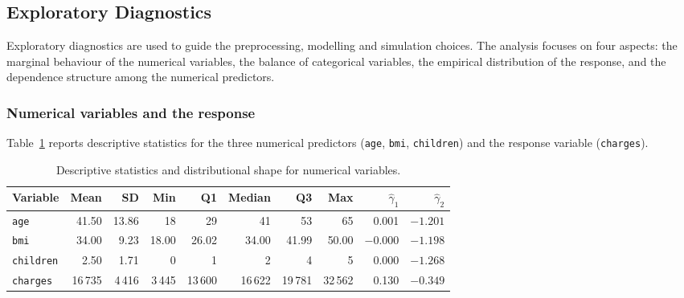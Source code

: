 
\subsection{Exploratory Diagnostics}
\label{sec:eda_model_simulation_design}

Exploratory diagnostics are used to guide the preprocessing, modelling and
simulation choices.  The analysis focuses on four aspects: the marginal
behaviour of the numerical variables, the balance of categorical variables,
the empirical distribution of the response, and the dependence structure
among the numerical predictors.


\subsubsection{Numerical variables and the response}

Table~\ref{tab:numeric_eda_summary} reports descriptive statistics for the
three numerical predictors (\texttt{age}, \texttt{bmi}, \texttt{children})
and the response variable (\texttt{charges}).

\begin{table}[H]
\centering
\small
\renewcommand{\arraystretch}{1.12}
\begin{tabular}{lrrrrrrrrr}
\toprule
\textbf{Variable} &
\textbf{Mean} &
\textbf{SD} &
\textbf{Min} &
\textbf{Q1} &
\textbf{Median} &
\textbf{Q3} &
\textbf{Max} &
$\widehat{\gamma}_1$ &
$\widehat{\gamma}_2$ \\
\midrule
\texttt{age}      & 41.50   & 13.86  & 18    & 29    & 41    & 53    & 65     & 0.001  & $-1.201$ \\
\texttt{bmi}      & 34.00   & 9.23   & 18.00 & 26.02 & 34.00 & 41.99 & 50.00  & $-0.000$ & $-1.198$ \\
\texttt{children} & 2.50    & 1.71   & 0     & 1     & 2     & 4     & 5      & 0.000  & $-1.268$ \\
\texttt{charges}  & 16\,735 & 4\,416 & 3\,445 & 13\,600 & 16\,622 & 19\,781 & 32\,562 & 0.130 & $-0.349$ \\
\bottomrule
\end{tabular}
\caption{Descriptive statistics and distributional shape for numerical variables.}
\label{tab:numeric_eda_summary}
\end{table}

